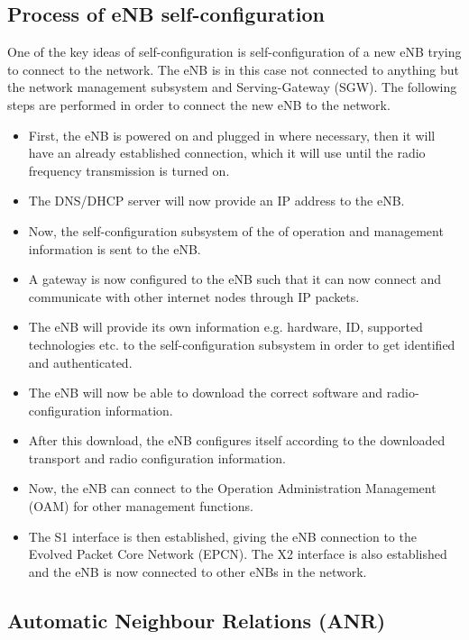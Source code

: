 \documentclass{report}
\begin{document}
\subsection{Process of eNB self-configuration}

One of the key ideas of self-configuration is self-configuration of a new eNB trying to connect to the network. The eNB is in this case not connected to anything but the network management subsystem and Serving-Gateway (SGW). The following steps are performed in order to connect the new eNB to the network. 

\begin{itemize}
	\item First, the eNB is powered on and plugged in where necessary, then it will have an already 	established connection, which it will use until the radio frequency transmission is turned on.
	\item The DNS/DHCP server will now provide an IP address to the eNB.
	\item Now, the self-configuration subsystem of the of operation and management information is 		sent to the eNB. 
	\item A gateway is now configured to the eNB such that it can now connect and communicate with other internet nodes through IP packets.
	\item The eNB will provide its own information e.g. hardware, ID, supported technologies etc. to the self-configuration subsystem in order to get identified and authenticated. 
	\item The eNB will now be able to download the correct software and radio-configuration information. 
	\item After this download, the eNB configures itself according to the downloaded transport and radio configuration information. 
	\item Now, the eNB can connect to the Operation Administration Management (OAM) for other management functions.
	\item The S1 interface is then established, giving the eNB connection to the Evolved Packet Core Network (EPCN). The X2 interface is also established and the eNB is now connected to other eNBs in the network. \cite{Atayero2014}
\end{itemize}

\subsection{Automatic Neighbour Relations (ANR)}
\end{document}
